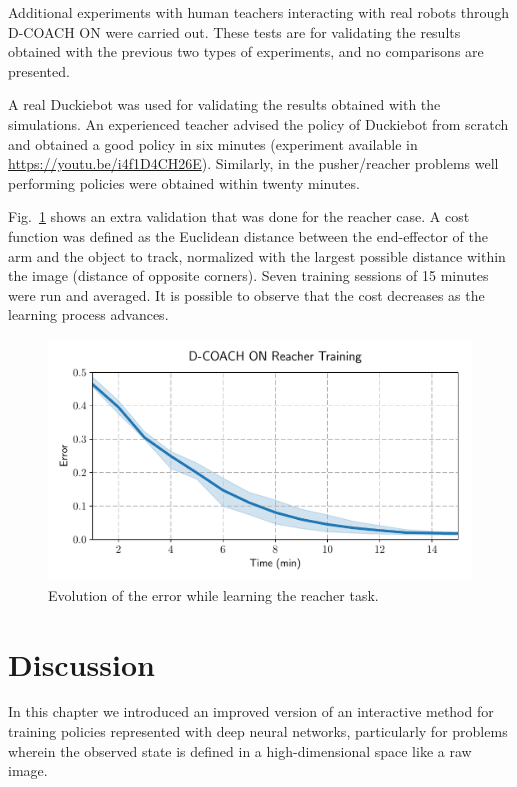 Additional experiments with human teachers interacting with real robots through D-COACH ON were carried out. These tests are for validating the results obtained with the previous two types of experiments, and no comparisons are presented.

A real Duckiebot was used for validating the results obtained with the simulations. An experienced teacher advised the policy of Duckiebot from scratch and obtained a good policy in six minutes (experiment available in \url{https://youtu.be/i4f1D4CH26E}). Similarly, in the pusher/reacher problems well performing policies were obtained within twenty minutes. 

Fig.~\ref{fig:reacher_exp} shows an extra validation that was done for the reacher case. A cost function was defined as the Euclidean distance between the end-effector of the arm and the object to track, normalized with the largest possible distance within the image (distance of opposite corners). Seven training sessions of 15 minutes were run and averaged. It is possible to observe that the cost decreases as the learning process advances. 

\begin{figure}[H]
    \centering
    \includegraphics[width=0.7\linewidth]{imagenes/cap3/reacher_ICRA.pdf}
    \caption{Evolution of the error while learning the reacher task. }
    \label{fig:reacher_exp}
\end{figure}

\section{Discussion}

In this chapter we introduced an improved version of an interactive method for training policies represented with deep neural networks, particularly for problems wherein the observed state is defined in a high-dimensional space like a raw image.

